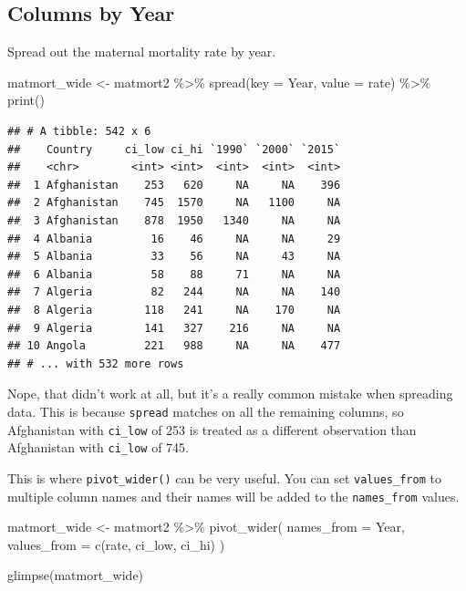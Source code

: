 \documentclass[
  oneside]{book}
\newenvironment{Shaded}{\begin{snugshade}}{\end{snugshade}}
\newcommand{\AttributeTok}[1]{\textcolor[rgb]{0.77,0.63,0.00}{#1}}
\newcommand{\FunctionTok}[1]{\textcolor[rgb]{0.00,0.00,0.00}{#1}}
\newcommand{\NormalTok}[1]{#1}
\newcommand{\OtherTok}[1]{\textcolor[rgb]{0.56,0.35,0.01}{#1}}
\newcommand{\SpecialCharTok}[1]{\textcolor[rgb]{0.00,0.00,0.00}{#1}}
\begin{document}
\hypertarget{columns-by-year}{%
\subsection{Columns by Year}\label{columns-by-year}}

Spread out the maternal mortality rate by year.

\begin{Shaded}
\begin{Highlighting}[]
\NormalTok{matmort\_wide }\OtherTok{\textless{}{-}}\NormalTok{ matmort2 }\SpecialCharTok{\%\textgreater{}\%}
  \FunctionTok{spread}\NormalTok{(}\AttributeTok{key =}\NormalTok{ Year, }\AttributeTok{value =}\NormalTok{ rate) }\SpecialCharTok{\%\textgreater{}\%}
  \FunctionTok{print}\NormalTok{()}
\end{Highlighting}
\end{Shaded}

\begin{verbatim}
## # A tibble: 542 x 6
##    Country     ci_low ci_hi `1990` `2000` `2015`
##    <chr>        <int> <int>  <int>  <int>  <int>
##  1 Afghanistan    253   620     NA     NA    396
##  2 Afghanistan    745  1570     NA   1100     NA
##  3 Afghanistan    878  1950   1340     NA     NA
##  4 Albania         16    46     NA     NA     29
##  5 Albania         33    56     NA     43     NA
##  6 Albania         58    88     71     NA     NA
##  7 Algeria         82   244     NA     NA    140
##  8 Algeria        118   241     NA    170     NA
##  9 Algeria        141   327    216     NA     NA
## 10 Angola         221   988     NA     NA    477
## # ... with 532 more rows
\end{verbatim}

\begin{warning}
Nope, that didn't work at all, but it's a really common mistake when spreading data. This is because \texttt{spread} matches on all the remaining columns, so Afghanistan with \texttt{ci\_low} of 253 is treated as a different observation than Afghanistan with \texttt{ci\_low} of 745.

\end{warning}

This is where \texttt{pivot\_wider()} can be very useful. You can set \texttt{values\_from} to multiple column names and their names will be added to the \texttt{names\_from} values.

\begin{Shaded}
\begin{Highlighting}[]
\NormalTok{matmort\_wide }\OtherTok{\textless{}{-}}\NormalTok{ matmort2 }\SpecialCharTok{\%\textgreater{}\%}
  \FunctionTok{pivot\_wider}\NormalTok{(}
    \AttributeTok{names\_from =}\NormalTok{ Year,}
    \AttributeTok{values\_from =} \FunctionTok{c}\NormalTok{(rate, ci\_low, ci\_hi)}
\NormalTok{  )}
              
\FunctionTok{glimpse}\NormalTok{(matmort\_wide)}
\end{Highlighting}
\end{Shaded}
\end{document}
